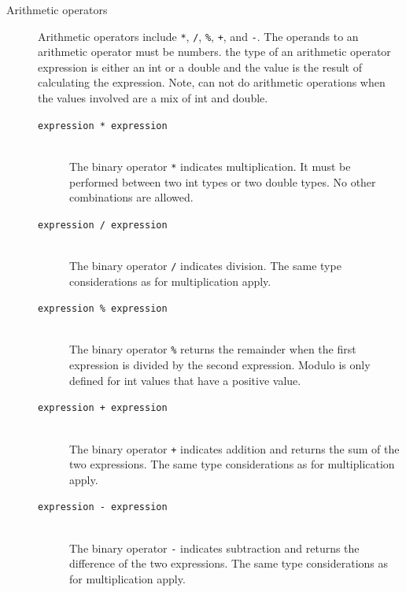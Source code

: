\documentclass[11pt]{report}
\begin{document}
\begin{description}
\item[Arithmetic operators]
Arithmetic operators include \texttt{*}, \texttt{/}, \texttt{\%}, \texttt{+}, and \texttt{-}. The operands to an arithmetic operator must be numbers. the type of an arithmetic operator expression is either an int or a double and the value is the result of calculating the expression. Note, can not do arithmetic operations when the values involved are a mix of int and double.
	\begin{description}
		\item[\texttt{expression * expression}] \hfill \\ The binary operator \texttt{*} indicates multiplication. It must be performed between two int types or two double types. No other combinations are allowed. 
		\item[\texttt{expression / expression}] \hfill \\ The binary operator \texttt{/} indicates division. The same type considerations as for multiplication apply. 
		\item[\texttt{expression \% expression}] \hfill \\ The binary operator \texttt{\%} returns the remainder when the first expression is divided by the second expression. Modulo is only defined for int values that have a positive value. 
		\item[\texttt{expression + expression}] \hfill \\ The binary operator \texttt{+} indicates addition and returns the sum of the two expressions. The same type considerations as for multiplication apply. 
		\item[\texttt{expression - expression}] \hfill \\ The binary operator \texttt{-} indicates subtraction and returns the difference of the two expressions. The same type considerations as for multiplication apply.
	\end{description}


\end{description}
\end{document}
